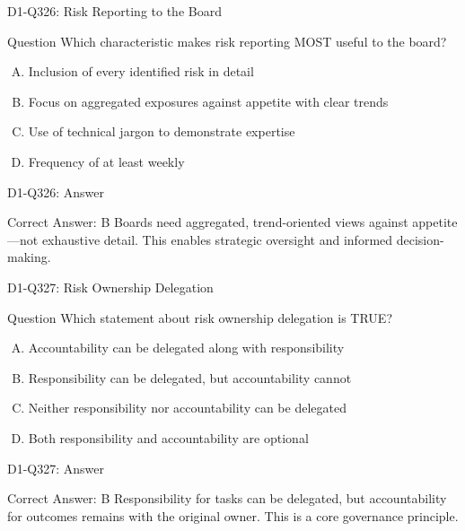 \documentclass{beamer}
\begin{document}
\begin{frame}{D1-Q326: Risk Reporting to the Board}
	\begin{block}{Question}
		Which characteristic makes risk reporting MOST useful to the board?
	\end{block}
	\begin{enumerate}[(A)]
		\item Inclusion of every identified risk in detail
		\item Focus on aggregated exposures against appetite with clear trends
		\item Use of technical jargon to demonstrate expertise
		\item Frequency of at least weekly
	\end{enumerate}
\end{frame}
\begin{frame}{D1-Q326: Answer}
	\begin{block}{Correct Answer: B}
		Boards need aggregated, trend-oriented views against appetite—not exhaustive detail. This enables strategic oversight and informed decision-making.
	\end{block}
\end{frame}

\begin{frame}{D1-Q327: Risk Ownership Delegation}
	\begin{block}{Question}
		Which statement about risk ownership delegation is TRUE?
	\end{block}
	\begin{enumerate}[(A)]
		\item Accountability can be delegated along with responsibility
		\item Responsibility can be delegated, but accountability cannot
		\item Neither responsibility nor accountability can be delegated
		\item Both responsibility and accountability are optional
	\end{enumerate}
\end{frame}
\begin{frame}{D1-Q327: Answer}
	\begin{block}{Correct Answer: B}
		Responsibility for tasks can be delegated, but accountability for outcomes remains with the original owner. This is a core governance principle.
	\end{block}
\end{frame}
\end{document}
